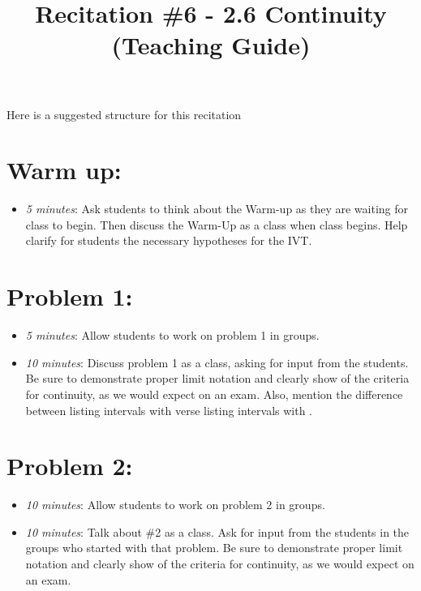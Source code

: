 \documentclass[handout,nooutcomes]{ximera}
\title{Recitation \#6 - 2.6 Continuity (Teaching Guide)}
\begin{document}
\begin{abstract}		\end{abstract}
\maketitle

Here is a suggested structure for this recitation

\section*{Warm up:} 
	
	\begin{itemize}
	
	\item  \emph{5 minutes}:  Ask students to think about the Warm-up as they are waiting for class to begin.  Then discuss the Warm-Up as a class when class begins. Help clarify for students the necessary hypotheses for the IVT.
	
	\end{itemize}


\section*{Problem 1:}

	\begin{itemize}
	
	\item  \emph{5 minutes}:  Allow students to work on problem 1 in groups.  
	
	\item  \emph{10 minutes}:  Discuss problem 1 as a class, asking for input from the students.  Be sure to demonstrate proper limit notation and clearly show of the criteria for continuity, as we would expect on an exam.  Also, mention the difference between listing intervals with  verse listing intervals with .
		
	\end{itemize}
	
	
	
\section*{Problem 2:}

	\begin{itemize}
	
	\item  \emph{10 minutes}:  Allow students to work on problem 2 in groups. 
	
	\item  \emph{10 minutes}:  Talk about \#2 as a class.  Ask for input from the students in the groups who started with that problem.  Be sure to demonstrate proper limit notation and clearly show of the criteria for continuity, as we would expect on an exam.
	
	\end{itemize}
	
\end{document}
